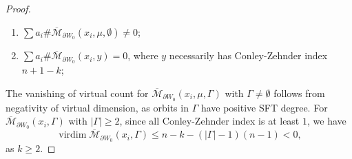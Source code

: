 \documentclass[11pt]{amsart}
\numberwithin{equation}{section}
\def\cM{{\mathcal M}}
\DeclareMathOperator{\virdim}{virdim}
\begin{document}
\begin{proof}
\begin{enumerate}
    \item $\sum a_i\#\overline{\cM}_{\partial W_0}(x_i,\mu,\emptyset)\ne 0$;
    \item $\sum a_i\#\overline{\cM}_{\partial W_0}(x_i,y)=0$, where $y$ necessarily has Conley-Zehnder index $n+1-k$;
\end{enumerate}
The vanishing of virtual count for $\overline{\cM}_{\partial W_0}(x_i,\mu, \Gamma)$ with $\Gamma\ne \emptyset$ follows from negativity of virtual dimension, as orbits in $\Gamma$ have positive SFT degree. For $\overline{\cM}_{\partial W_0}(x_i,\Gamma)$ with $|\Gamma|\ge 2$, since all Conley-Zehnder index is at least $1$, we have 
\begin{equation}\label{eqn:vdim}
    \virdim \overline{\cM}_{\partial W_0}(x_i,\Gamma) \le n-k-(|\Gamma|-1)(n-1)<0,
\end{equation}
as $k\ge 2$. 


\end{proof}
\end{document}
